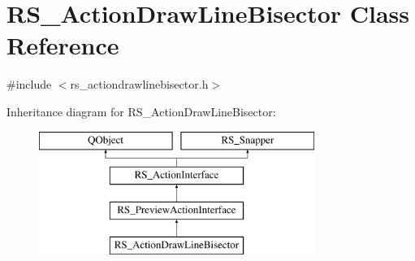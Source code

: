\hypertarget{classRS__ActionDrawLineBisector}{\section{R\-S\-\_\-\-Action\-Draw\-Line\-Bisector Class Reference}
\label{classRS__ActionDrawLineBisector}
}


{\ttfamily \#include $<$rs\-\_\-actiondrawlinebisector.\-h$>$}

Inheritance diagram for R\-S\-\_\-\-Action\-Draw\-Line\-Bisector\-:\begin{figure}[H]
\begin{center}
\leavevmode
\includegraphics[height=4.000000cm]{classRS__ActionDrawLineBisector}
\end{center}
\end{figure}
